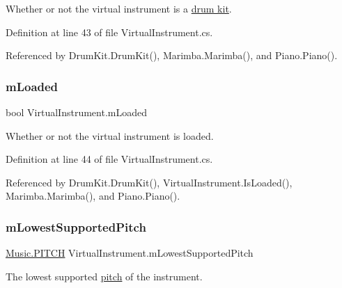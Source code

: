 Whether or not the virtual instrument is a \hyperlink{class_drum_kit}{drum kit}. 



Definition at line 43 of file Virtual\+Instrument.\+cs.



Referenced by Drum\+Kit.\+Drum\+Kit(), Marimba.\+Marimba(), and Piano.\+Piano().

\mbox{\label{group___v_i_base_pro_var_ga8978807d1878db5aae91fbd057c46097}} 
\subsubsection{\texorpdfstring{m\+Loaded}{mLoaded}}
{\footnotesize\ttfamily bool Virtual\+Instrument.\+m\+Loaded\hspace{0.3cm}{\ttfamily [protected]}}



Whether or not the virtual instrument is loaded. 



Definition at line 44 of file Virtual\+Instrument.\+cs.



Referenced by Drum\+Kit.\+Drum\+Kit(), Virtual\+Instrument.\+Is\+Loaded(), Marimba.\+Marimba(), and Piano.\+Piano().

\mbox{\label{group___v_i_base_pro_var_ga3cae52b1bcc0178a8a6b03c7aaf7aac8}} 
\subsubsection{\texorpdfstring{m\+Lowest\+Supported\+Pitch}{mLowestSupportedPitch}}
{\footnotesize\ttfamily \hyperlink{group___music_enums_ga508f69b199ea518f935486c990edac1d}{Music.\+P\+I\+T\+CH} Virtual\+Instrument.\+m\+Lowest\+Supported\+Pitch\hspace{0.3cm}{\ttfamily [protected]}}



The lowest supported \hyperlink{group___music_enums_ga508f69b199ea518f935486c990edac1d}{pitch} of the instrument. 



